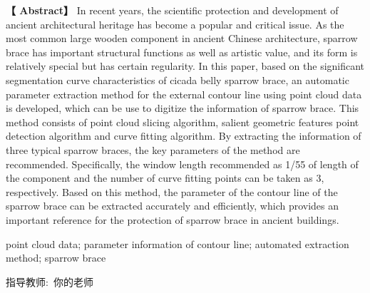 \newpage
\centerline{\fangsong\bf{}}

\vspace{10bp}

\centerline{\fangsong\bf{}}


\vskip 20bp

\hspace{4bp} {\textbf{【 Abstract】}} 
In recent years, the scientific protection and development of ancient architectural heritage has become a popular and critical issue. As the most common large wooden component in ancient Chinese architecture, sparrow brace has important structural functions as well as artistic value, and its form is relatively special but has certain regularity. In this paper, based on the significant segmentation curve characteristics of cicada belly sparrow brace, an automatic parameter extraction method for the external contour line using point cloud data is developed, which can be use to digitize the information of sparrow brace. This method consists of point cloud slicing algorithm, salient geometric features point detection algorithm and curve fitting algorithm. By extracting the information of three typical sparrow braces, the key parameters of the method are recommended. Specifically, the window length recommended as 1/55 of length of the component and the number of curve fitting points can be taken as 3, respectively. Based on this method, the parameter of the contour line of the sparrow brace can be extracted accurately and efficiently, which provides an important reference for the protection of sparrow brace in ancient buildings.

\vskip 10bp

point cloud data; parameter information of contour line; automated extraction method; sparrow brace


\vskip 20bp

\begin{flushright}
	\kaishu 指导教师:\ 你的老师 \hspace{3cm}{ }
\end{flushright}

\label{lastpage}%
